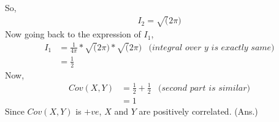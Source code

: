 \documentclass{article}
\theoremstyle{remark}
\begin{document}
So,
\begin{align*}
    I_2 = \sqrt(2\pi)
\end{align*}
Now going back to the expression of $I_1$,
\begin{align*}
    I_1 &= \frac{1}{4\pi}*\sqrt(2\pi)*\sqrt(2\pi) &\textit{(integral over $y$ is exactly same)}\\
    &= \frac{1}{2}
\end{align*}
Now,
\begin{align*}
    Cov(X,Y) &= \frac{1}{2} + \frac{1}{2} &\textit{(second part is similar)}\\
    &=1
\end{align*}
Since $Cov(X,Y)$ is $+ve$, $X$ and $Y$ are positively correlated. (Ans.)
\end{document}
